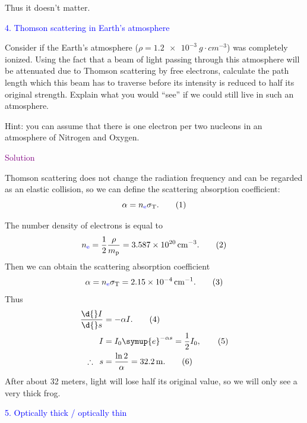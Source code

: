 \documentclass[UTF8, 12pt, a4paper, oneside, twocolumn, fontset=none]{ctexart}
\begin{document}
Thus it doesn't matter.

\hspace*{\fill}

\noindent\textcolor{blue}{4. Thomson scattering in Earth's atmosphere}

\noindent Consider if the Earth's atmosphere ($\rho=\qty{1.2e-3}{g\cdot{}cm^{-3}}$) was completely ionized. Using the fact that a beam of light passing through this atmosphere will be attenuated due to Thomson scattering by free electrons, calculate the path length which this beam has to traverse before its intensity is reduced to half its original strength. Explain what you would ``see'' if we could still live in such an atmosphere.

\noindent Hint: you can assume that there is one electron per two nucleons in an atmosphere of Nitrogen and Oxygen.

\hspace*{\fill}

\noindent\textcolor{purple}{Solution}

Thomson scattering does not change the radiation frequency and can be regarded as an elastic collision, so we can define the scattering absorption coefficient:
\begin{equation}
\alpha=n_{{\color{blue}{\ce{e}}}}\sigma_{\mathrm{T}}.\tag{1}
\end{equation}

The number density of electrons is equal to
\begin{equation}
n_{{\color{blue}{\ce{e}}}}=\frac{1}{2}\frac{\rho}{m_{\ce{p}}}=\qty{3.587e20}{cm^{-3}}.\tag{2}
\end{equation}
Then we can obtain the scattering absorption coefficient
\begin{equation}
\alpha=n_{{\color{blue}{\ce{e}}}}\sigma_{\mathrm{T}}=\qty{2.15e-4}{cm^{-1}}.\tag{3}
\end{equation}
Thus
\begin{align}
\frac{\d{}I}{\d{}s}&=-\alpha{}I.\tag{4}\\
I&=I_{0}\symup{e}^{-\alpha{}s}=\frac{1}{2}I_{0},\tag{5}\\
\therefore\enspace{}s&=\frac{\ln2}{\alpha}=\qty{32.2}{m}.\tag{6}
\end{align}
After about 32 meters, light will lose half its original value, so we will only see a very thick frog.

\hspace*{\fill}

\noindent\textcolor{blue}{5. Optically thick / optically thin}
\end{document}

